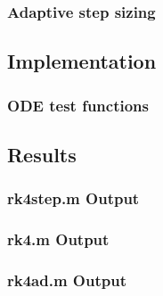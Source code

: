 \documentclass[10pt]{article}
\begin{document}

\subsubsection*{Adaptive step sizing}





\subsection*{Implementation}

\subsubsection*{ODE test functions} %

\subsection*{Results}

\subsubsection*{rk4step.m Output}

\subsubsection*{rk4.m Output}

\subsubsection*{rk4ad.m Output}


\end{document}
